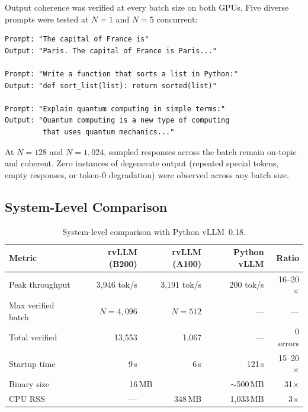 \documentclass[11pt,a4paper]{article}
\newcommand{\thead}[1]{\textbf{\color{white}#1}}
\begin{document}
Output coherence was verified at every batch size on both GPUs. Five diverse
prompts were tested at $N\!=\!1$ and $N\!=\!5$ concurrent:

\begin{lstlisting}[language={},numbers=none,frame=none,xleftmargin=0em]
Prompt: "The capital of France is"
Output: "Paris. The capital of France is Paris..."

Prompt: "Write a function that sorts a list in Python:"
Output: "def sort_list(list): return sorted(list)"

Prompt: "Explain quantum computing in simple terms:"
Output: "Quantum computing is a new type of computing
         that uses quantum mechanics..."
\end{lstlisting}

At $N\!=\!128$ and $N\!=\!1{,}024$, sampled responses across the batch remain
on-topic and coherent. Zero instances of degenerate output (repeated special tokens,
empty responses, or token-0 degradation) were observed across any batch size.

\subsection{System-Level Comparison}

\begin{table}[t]
  \centering
  \caption{System-level comparison with Python vLLM~0.18.}
  \label{tab:system}
  \small
  \begin{tabular}{@{}lrrrr@{}}
    \toprule
    \rowcolor{HeaderBlue} \thead{Metric} & \thead{rvLLM (B200)} & \thead{rvLLM (A100)} & \thead{Python vLLM} & \thead{Ratio} \\
    \midrule
    Peak throughput    & 3{,}946 tok/s & 3{,}191 tok/s & 200 tok/s & 16--20$\times$ \\
    \rowcolor{gray!8}
    Max verified batch & $N\!=\!4{,}096$ & $N\!=\!512$ & --- & --- \\
    Total verified     & 13{,}553 & 1{,}067 & --- & 0 errors \\
    \rowcolor{gray!8}
    Startup time       & 9\,s    & 6\,s    & 121\,s  & 15--20$\times$ \\
    Binary size        & \multicolumn{2}{c}{16\,MB} & $\sim$500\,MB & 31$\times$ \\
    \rowcolor{gray!8}
    CPU RSS            & ---     & 348\,MB & 1{,}033\,MB & 3$\times$ \\
    \bottomrule
  \end{tabular}
\end{table}
\end{document}
